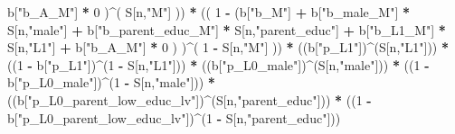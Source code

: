 \documentclass[
]{book}
\newenvironment{Shaded}{\begin{snugshade}}{\end{snugshade}}
\newcommand{\DecValTok}[1]{\textcolor[rgb]{0.00,0.00,0.81}{#1}}
\newcommand{\NormalTok}[1]{#1}
\newcommand{\SpecialCharTok}[1]{\textcolor[rgb]{0.81,0.36,0.00}{\textbf{#1}}}
\newcommand{\StringTok}[1]{\textcolor[rgb]{0.31,0.60,0.02}{#1}}
\begin{document}
\begin{Shaded}
\begin{Highlighting}[]
\NormalTok{           b[}\StringTok{"b\_A\_M"}\NormalTok{] }\SpecialCharTok{*} \DecValTok{0}\NormalTok{ )}\SpecialCharTok{\^{}}\NormalTok{( S[n,}\StringTok{"M"}\NormalTok{] )) }\SpecialCharTok{*}
\NormalTok{      (( }\DecValTok{1} \SpecialCharTok{{-}}\NormalTok{ (b[}\StringTok{"b\_M"}\NormalTok{] }\SpecialCharTok{+} 
\NormalTok{                b[}\StringTok{"b\_male\_M"}\NormalTok{] }\SpecialCharTok{*}\NormalTok{ S[n,}\StringTok{"male"}\NormalTok{] }\SpecialCharTok{+} 
\NormalTok{                b[}\StringTok{"b\_parent\_educ\_M"}\NormalTok{] }\SpecialCharTok{*}\NormalTok{ S[n,}\StringTok{"parent\_educ"}\NormalTok{] }\SpecialCharTok{+} 
\NormalTok{                b[}\StringTok{"b\_L1\_M"}\NormalTok{] }\SpecialCharTok{*}\NormalTok{ S[n,}\StringTok{"L1"}\NormalTok{] }\SpecialCharTok{+}
\NormalTok{                b[}\StringTok{"b\_A\_M"}\NormalTok{] }\SpecialCharTok{*} \DecValTok{0}\NormalTok{ ) )}\SpecialCharTok{\^{}}\NormalTok{( }\DecValTok{1} \SpecialCharTok{{-}}\NormalTok{ S[n,}\StringTok{"M"}\NormalTok{] )) }\SpecialCharTok{*}
\NormalTok{      ((b[}\StringTok{"p\_L1"}\NormalTok{])}\SpecialCharTok{\^{}}\NormalTok{(S[n,}\StringTok{"L1"}\NormalTok{])) }\SpecialCharTok{*}
\NormalTok{      ((}\DecValTok{1} \SpecialCharTok{{-}}\NormalTok{ b[}\StringTok{"p\_L1"}\NormalTok{])}\SpecialCharTok{\^{}}\NormalTok{(}\DecValTok{1} \SpecialCharTok{{-}}\NormalTok{ S[n,}\StringTok{"L1"}\NormalTok{])) }\SpecialCharTok{*}
\NormalTok{      ((b[}\StringTok{"p\_L0\_male"}\NormalTok{])}\SpecialCharTok{\^{}}\NormalTok{(S[n,}\StringTok{"male"}\NormalTok{])) }\SpecialCharTok{*} 
\NormalTok{      ((}\DecValTok{1} \SpecialCharTok{{-}}\NormalTok{ b[}\StringTok{"p\_L0\_male"}\NormalTok{])}\SpecialCharTok{\^{}}\NormalTok{(}\DecValTok{1} \SpecialCharTok{{-}}\NormalTok{ S[n,}\StringTok{"male"}\NormalTok{])) }\SpecialCharTok{*} 
\NormalTok{      ((b[}\StringTok{"p\_L0\_parent\_low\_educ\_lv"}\NormalTok{])}\SpecialCharTok{\^{}}\NormalTok{(S[n,}\StringTok{"parent\_educ"}\NormalTok{])) }\SpecialCharTok{*}
\NormalTok{      ((}\DecValTok{1} \SpecialCharTok{{-}}\NormalTok{ b[}\StringTok{"p\_L0\_parent\_low\_educ\_lv"}\NormalTok{])}\SpecialCharTok{\^{}}\NormalTok{(}\DecValTok{1} \SpecialCharTok{{-}}\NormalTok{ S[n,}\StringTok{"parent\_educ"}\NormalTok{])) }
    

\end{Highlighting}
\end{Shaded}
\end{document}
